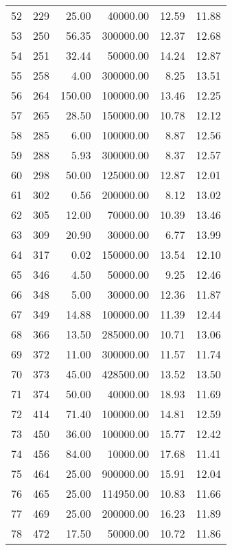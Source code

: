 \begin{tabular}{rrrrrr}
    52 &    229 &  25.00 &  40000.00 &  12.59 & 11.88 \\
    53 &    250 &  56.35 & 300000.00 &  12.37 & 12.68 \\
    54 &    251 &  32.44 &  50000.00 &  14.24 & 12.87 \\
    55 &    258 &   4.00 & 300000.00 &   8.25 & 13.51 \\
    56 &    264 & 150.00 & 100000.00 &  13.46 & 12.25 \\
    57 &    265 &  28.50 & 150000.00 &  10.78 & 12.12 \\
    58 &    285 &   6.00 & 100000.00 &   8.87 & 12.56 \\
    59 &    288 &   5.93 & 300000.00 &   8.37 & 12.57 \\
    60 &    298 &  50.00 & 125000.00 &  12.87 & 12.01 \\
    61 &    302 &   0.56 & 200000.00 &   8.12 & 13.02 \\
    62 &    305 &  12.00 &  70000.00 &  10.39 & 13.46 \\
    63 &    309 &  20.90 &  30000.00 &   6.77 & 13.99 \\
    64 &    317 &   0.02 & 150000.00 &  13.54 & 12.10 \\
    65 &    346 &   4.50 &  50000.00 &   9.25 & 12.46 \\
    66 &    348 &   5.00 &  30000.00 &  12.36 & 11.87 \\
    67 &    349 &  14.88 & 100000.00 &  11.39 & 12.44 \\
    68 &    366 &  13.50 & 285000.00 &  10.71 & 13.06 \\
    69 &    372 &  11.00 & 300000.00 &  11.57 & 11.74 \\
    70 &    373 &  45.00 & 428500.00 &  13.52 & 13.50 \\
    71 &    374 &  50.00 &  40000.00 &  18.93 & 11.69 \\
    72 &    414 &  71.40 & 100000.00 &  14.81 & 12.59 \\
    73 &    450 &  36.00 & 100000.00 &  15.77 & 12.42 \\
    74 &    456 &  84.00 &  10000.00 &  17.68 & 11.41 \\
    75 &    464 &  25.00 & 900000.00 &  15.91 & 12.04 \\
    76 &    465 &  25.00 & 114950.00 &  10.83 & 11.66 \\
    77 &    469 &  25.00 & 200000.00 &  16.23 & 11.89 \\
    78 &    472 &  17.50 &  50000.00 &  10.72 & 11.86 \\

\end{tabular}
